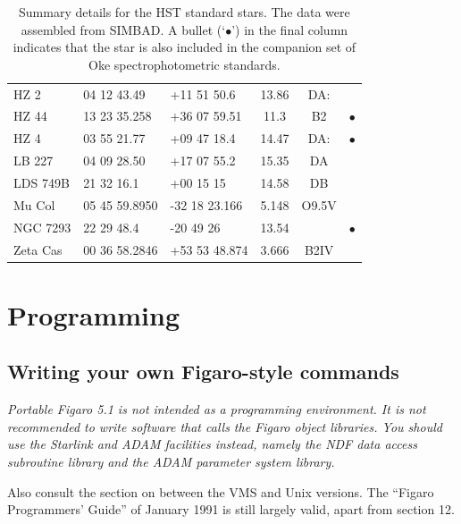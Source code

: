 \begin{table}[htbp]
\begin{center}
\begin{tabular}{lllccc}
HZ 2        & 04 12 43.49   & +11 51 50.6   &  13.86  & DA:    &   \\
HZ 44       & 13 23 35.258  & +36 07 59.51  &  11.3   & B2     & $\bullet$ \\
HZ 4        & 03 55 21.77   & +09 47 18.4   &  14.47  & DA:    & $\bullet$ \\
LB 227      & 04 09 28.50   & +17 07 55.2   &  15.35  & DA     &   \\
LDS 749B    & 21 32 16.1    & +00 15 15     &  14.58  & DB     &   \\
Mu Col      & 05 45 59.8950 & -32 18 23.166 &   5.148 & O9.5V  &   \\
NGC 7293    & 22 29 48.4    & -20 49 26     &  13.54  &        & $\bullet$ \\
Zeta Cas    & 00 36 58.2846 & +53 53 48.874 &   3.666 & B2IV   &   \\
\end{tabular}
\end{center}

\begin{quote}
\caption{Summary details for the HST standard stars.  The data were
assembled from SIMBAD.  A bullet (`$\bullet$') in the final column
indicates that the star is also included in the companion set of Oke
spectrophotometric standards.
\label{HSTSTAND} }
\end{quote}

\end{table}



\newpage %
\section{Programming}


\subsection{\label{proghint}Writing your own Figaro-style commands}

{\em
   Portable Figaro 5.1 is not intended as a programming environment. It
   is not recommended to write software that calls the Figaro object
   libraries. You should use the Starlink and ADAM facilities instead,
   namely the NDF data access subroutine library and the ADAM parameter
   system library.

   Also consult
   {the section on }
   between the VMS and Unix
   versions. The ``Figaro Programmers' Guide'' of January 1991 is still
   largely valid, apart from section 12.
\/}

